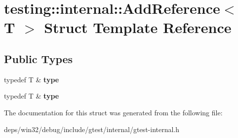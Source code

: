 \hypertarget{structtesting_1_1internal_1_1_add_reference}{}\section{testing\+:\+:internal\+:\+:Add\+Reference$<$ T $>$ Struct Template Reference}
\label{structtesting_1_1internal_1_1_add_reference}
\subsection*{Public Types}
\begin{DoxyCompactItemize}
\item 
\hypertarget{structtesting_1_1internal_1_1_add_reference_a2df8dd7c4e41f6390e6e66b1a9a67bb4}{}typedef T \& {\bfseries type}\label{structtesting_1_1internal_1_1_add_reference_a2df8dd7c4e41f6390e6e66b1a9a67bb4}

\item 
\hypertarget{structtesting_1_1internal_1_1_add_reference_a2df8dd7c4e41f6390e6e66b1a9a67bb4}{}typedef T \& {\bfseries type}\label{structtesting_1_1internal_1_1_add_reference_a2df8dd7c4e41f6390e6e66b1a9a67bb4}

\end{DoxyCompactItemize}


The documentation for this struct was generated from the following file\+:\begin{DoxyCompactItemize}
\item 
deps/win32/debug/include/gtest/internal/gtest-\/internal.\+h\end{DoxyCompactItemize}
